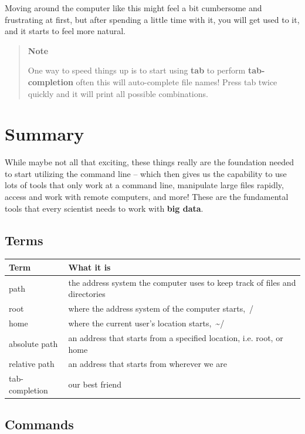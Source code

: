 \documentclass[
]{book}
\begin{document}
Moving around the computer like this might feel a bit cumbersome and frustrating at first, but after spending a little time with it, you will get used to it, and it starts to feel more natural.

\begin{quote}
\textbf{Note}

One way to speed things up is to start using \textbf{tab} to perform \textbf{tab-completion} often this will auto-complete file names! Press tab twice quickly and it will print all possible combinations.
\end{quote}

\hypertarget{summary}{%
\section{Summary}\label{summary}}

While maybe not all that exciting, these things really are the foundation needed to start utilizing the command line -- which then gives us the capability to use lots of tools that only work at a command line, manipulate large files rapidly, access and work with remote computers, and more! These are the fundamental tools that every scientist needs to work with \textbf{big data}.

\hypertarget{terms}{%
\subsection{Terms}\label{terms}}

\begin{longtable}{ll}
\toprule
\textbf{Term} & \textbf{What it is}\\
\midrule
path & the address system the computer uses to keep track of files and directories\\
root & where the address system of the computer starts, /\\
home & where the current user’s location starts, \textasciitilde{}/\\
absolute path & an address that starts from a specified location, i.e. root, or home\\
relative path & an address that starts from wherever we are\\
\addlinespace
tab-completion & our best friend\\
\bottomrule
\end{longtable}

\hypertarget{commands}{%
\subsection{Commands}\label{commands}}
\end{document}
